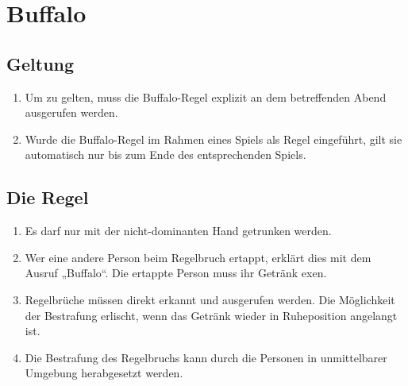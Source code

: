 \chapter{Buffalo}
\section{Geltung}
\begin{enumerate}[label={(\arabic*)}]
    \item
    Um zu gelten, muss die Buffalo-Regel explizit an dem betreffenden Abend ausgerufen werden.

    \item
    Wurde die Buffalo-Regel im Rahmen eines Spiels als Regel eingeführt, gilt sie automatisch nur bis zum Ende des entsprechenden Spiels.
\end{enumerate}

\section{Die Regel}
\begin{enumerate}[label={(\arabic*)}]
    \item
    Es darf nur mit der nicht-dominanten Hand getrunken werden.

    \item
    Wer eine andere Person beim Regelbruch ertappt, erklärt dies mit dem Ausruf „Buffalo“.
    Die ertappte Person muss ihr Getränk exen.

    \item
    Regelbrüche müssen direkt erkannt und ausgerufen werden.
    Die Möglichkeit der Bestrafung erlischt, wenn das Getränk wieder in Ruheposition angelangt ist.

    \item
    Die Bestrafung des Regelbruchs kann durch die Personen in unmittelbarer Umgebung herabgesetzt werden.
\end{enumerate}
